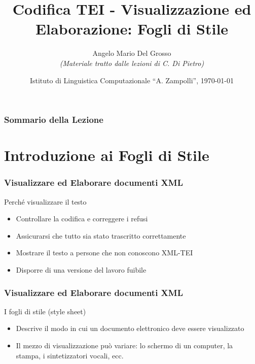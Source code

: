 \documentclass{beamer}
\title{Codifica TEI - Visualizzazione ed Elaborazione: Fogli di Stile}
\author[A.M. Del Grosso]{Angelo Mario Del Grosso \\ \tiny\textit{(Materiale tratto dalle lezioni di C. Di Pietro)}}
\institute{\texttt{angelo.delgrosso@ilc.cnr.it} \\\textit{CNR-ILC-LicoLab} \\\url{http://licolab.ilc.cnr.it/}}
\date{Istituto di Linguistica Computazionale ``A. Zampolli'', \today}
\begin{document}
    
    \begin{frame}
        \maketitle
    \end{frame}
    
    \begin{frame}
        \frametitle{Sommario della Lezione}
        \tableofcontents
    \end{frame}
    
    \section{Introduzione ai Fogli di Stile}
    
    \begin{frame}
        \frametitle{Visualizzare ed Elaborare documenti XML}
        \addtocounter{nframe}{1}
        

         \begin{block}{Perché visualizzare il testo}
             \begin{itemize}
                \item Controllare la codifica e correggere i refusi
                \item Assicurarsi che tutto sia stato trascritto correttamente
                \item Mostrare il testo a persone che non conoscono XML-TEI
                \item Disporre di una versione del lavoro fuibile
            \end{itemize}
         \end{block}
        
    \end{frame}
    
    \begin{frame}
        \frametitle{Visualizzare ed Elaborare documenti XML}
        \addtocounter{nframe}{1}
        
        \begin{block}{I fogli di stile (style sheet)}
           \begin{itemize}
               \item Descrive il modo in cui un documento elettronico deve essere visualizzato
               \item Il mezzo di visualizzazione può variare: lo schermo di un computer, la stampa, i sintetizzatori vocali, ecc.
           \end{itemize}
        \end{block}
        
    \end{frame}
    
\end{document}
